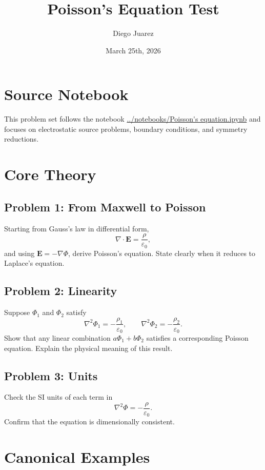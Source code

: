 \documentclass[hidelinks]{article}
\title{\textbf{Poisson's Equation Test}}
\author{Diego Juarez}
\date{March 25th, 2026}
\begin{document}
\hypersetup{bookmarksnumbered=true}
\pagecolor{black}
\color{white}
\maketitle

\begin{Large}
\tableofcontents
\end{Large}
\pagebreak

\section{Source Notebook}
This problem set follows the notebook
\url{../notebooks/Poisson's equation.ipynb}
and focuses on electrostatic source problems, boundary conditions, and symmetry reductions.

\section{Core Theory}
\subsection{Problem 1: From Maxwell to Poisson}
Starting from Gauss's law in differential form,
\[
\nabla\cdot \mathbf{E}=\frac{\rho}{\varepsilon_0},
\]
and using $\mathbf{E}=-\nabla \Phi$, derive Poisson's equation. State clearly when it reduces to Laplace's equation.

\subsection{Problem 2: Linearity}
Suppose $\Phi_1$ and $\Phi_2$ satisfy
\[
\nabla^2\Phi_1=-\frac{\rho_1}{\varepsilon_0}, \qquad
\nabla^2\Phi_2=-\frac{\rho_2}{\varepsilon_0}.
\]
Show that any linear combination $a\Phi_1+b\Phi_2$ satisfies a corresponding Poisson equation. Explain the physical meaning of this result.

\subsection{Problem 3: Units}
Check the SI units of each term in
\[
\nabla^2\Phi=-\frac{\rho}{\varepsilon_0}.
\]
Confirm that the equation is dimensionally consistent.

\section{Canonical Examples}
\end{document}
